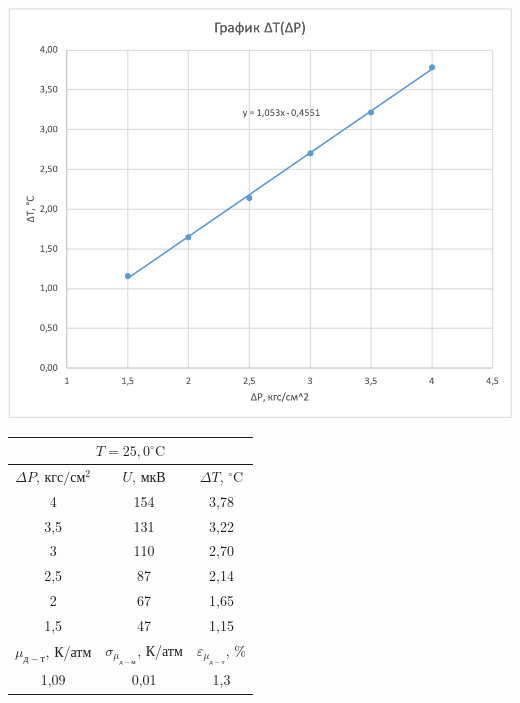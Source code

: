 \documentclass[a4paper, 12pt]{article}
\begin{document}
\begin{table}[pt]
        \vspace{0.5cm}
        
        \begin{minipage}[ht]{0.55\linewidth}
            \includegraphics[width=\linewidth]{images/ch2.png}
        \end{minipage}
        \hfill
        \begin{minipage}[ht]{0.47\linewidth}
            \begin{tabular}{|c|c|c|}
                \hline
                \multicolumn{3}{|c|}{$T = 25,0^{\circ}\text{C}$} \\
                \hline
                $\Delta P$, $кгс/см^2$ & $U$, $мкВ$ & $\Delta T$, $^{\circ}\text{C}$ \\
                \hline
                4 & 154 & 3,78 \\
                \hline
                3,5 & 131 & 3,22 \\
                \hline
                3 & 110 & 2,70 \\
                \hline
                2,5 & 87 & 2,14 \\
                \hline
                2 & 67 & 1,65 \\
                \hline
                1,5 & 47 & 1,15 \\
                \hline
                $\mu_{д-т}$, К/атм & $\sigma_{\mu_{д-м}}$, К/атм & $\varepsilon_{\mu_{д-т}}$, \% \\
                \hline
                1,09 & 0,01 & 1,3 \\
                \hline
            \end{tabular}
        \end{minipage}
        

\end{table}
\end{document}
